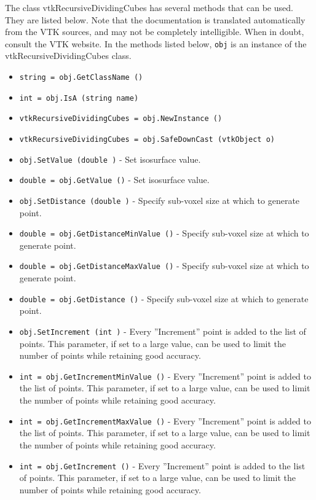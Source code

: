 The class vtkRecursiveDividingCubes has several methods that can be used.
  They are listed below.
Note that the documentation is translated automatically from the VTK sources,
and may not be completely intelligible.  When in doubt, consult the VTK website.
In the methods listed below, \verb|obj| is an instance of the vtkRecursiveDividingCubes class.
\begin{itemize}
\item  \verb|string = obj.GetClassName ()|

\item  \verb|int = obj.IsA (string name)|

\item  \verb|vtkRecursiveDividingCubes = obj.NewInstance ()|

\item  \verb|vtkRecursiveDividingCubes = obj.SafeDownCast (vtkObject o)|

\item  \verb|obj.SetValue (double )| -  Set isosurface value.

\item  \verb|double = obj.GetValue ()| -  Set isosurface value.

\item  \verb|obj.SetDistance (double )| -  Specify sub-voxel size at which to generate point.

\item  \verb|double = obj.GetDistanceMinValue ()| -  Specify sub-voxel size at which to generate point.

\item  \verb|double = obj.GetDistanceMaxValue ()| -  Specify sub-voxel size at which to generate point.

\item  \verb|double = obj.GetDistance ()| -  Specify sub-voxel size at which to generate point.

\item  \verb|obj.SetIncrement (int )| -  Every ''Increment'' point is added to the list of points. This parameter, if
 set to a large value, can be used to limit the number of points while
 retaining good accuracy.

\item  \verb|int = obj.GetIncrementMinValue ()| -  Every ''Increment'' point is added to the list of points. This parameter, if
 set to a large value, can be used to limit the number of points while
 retaining good accuracy.

\item  \verb|int = obj.GetIncrementMaxValue ()| -  Every ''Increment'' point is added to the list of points. This parameter, if
 set to a large value, can be used to limit the number of points while
 retaining good accuracy.

\item  \verb|int = obj.GetIncrement ()| -  Every ''Increment'' point is added to the list of points. This parameter, if
 set to a large value, can be used to limit the number of points while
 retaining good accuracy.

\end{itemize}
